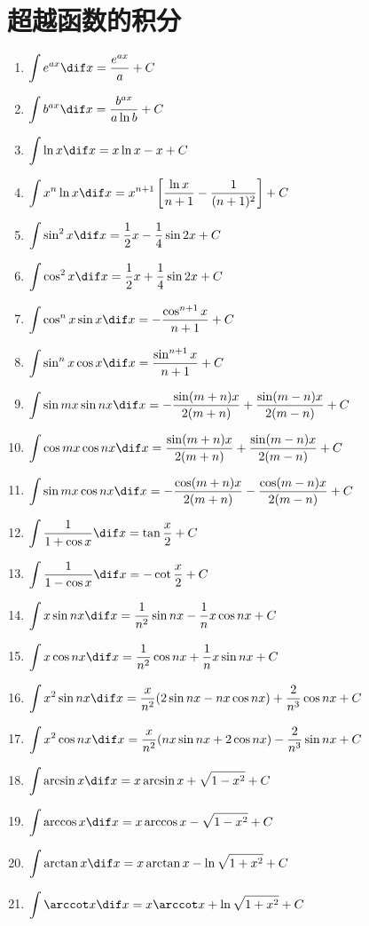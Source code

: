 \section*{超越函数的积分}
\begin{enumerate}[1.,itemsep=5pt,resume]
  \item $\displaystyle \int e^{ax}\dif x=\frac{e^{ax}}{a}+C$
  \item $\displaystyle \int b^{ax}\dif x=\frac{b^{ax}}{a\ln b}+C$
  \item $\displaystyle \int \ln x\dif x=x\ln x-x+C$
  \item $\displaystyle \int x^n\ln x\dif x=x^{n+1}\left[ \frac{\ln x}{n+1}-\frac{1}{(n+1)^2}\right]+C$
  \item $\displaystyle \int \sin^2 x\dif x=\frac{1}{2}x-\frac{1}{4}\sin2x+C$
  \item $\displaystyle \int \cos^2 x\dif x=\frac{1}{2}x+\frac{1}{4}\sin2x+C$
  \item $\displaystyle \int \cos^n x\sin x\dif x=-\frac{\cos^{n+1}x}{n+1}+C$
  \item $\displaystyle \int \sin^n x\cos x\dif x=\frac{\sin^{n+1}x}{n+1}+C$
  \item $\displaystyle \int \sin mx\sin nx\dif x=-\frac{\sin(m+n)x}{2(m+n)}+\frac{\sin(m-n)x}{2(m-n)}+C$
  \item $\displaystyle \int \cos mx\cos nx\dif x=\frac{\sin(m+n)x}{2(m+n)}+\frac{\sin(m-n)x}{2(m-n)}+C$
  \item $\displaystyle \int \sin mx\cos nx\dif x=-\frac{\cos(m+n)x}{2(m+n)}-\frac{\cos(m-n)x}{2(m-n)}+C$
  \item $\displaystyle \int \frac{1}{1+\cos x}\dif x=\tan\frac{x}{2}+C$
  \item $\displaystyle \int \frac{1}{1-\cos x}\dif x=-\cot\frac{x}{2}+C$
  \item $\displaystyle \int x\sin nx\dif x=\frac{1}{n^2}\sin nx-\frac{1}{n}x\cos nx+C$
  \item $\displaystyle \int x\cos nx\dif x=\frac{1}{n^2}\cos nx+\frac{1}{n}x\sin nx+C$
  \item $\displaystyle \int x^2\sin nx\dif x=\frac{x}{n^2}(2\sin nx-nx\cos nx)+\frac{2}{n^3}\cos nx+C$
  \item $\displaystyle \int x^2\cos nx\dif x=\frac{x}{n^2}(nx\sin nx+2\cos nx)-\frac{2}{n^3}\sin nx+C$
  \item $\displaystyle \int \arcsin x\dif x=x\arcsin x+\sqrt{1-x^2}+C$
  \item $\displaystyle \int \arccos x\dif x=x\arccos x-\sqrt{1-x^2}+C$
  \item $\displaystyle \int \arctan x\dif x=x\arctan x-\ln\sqrt{1+x^2}+C$
  \item $\displaystyle \int \arccot x\dif x=x\arccot x+\ln\sqrt{1+x^2}+C$
\end{enumerate}
